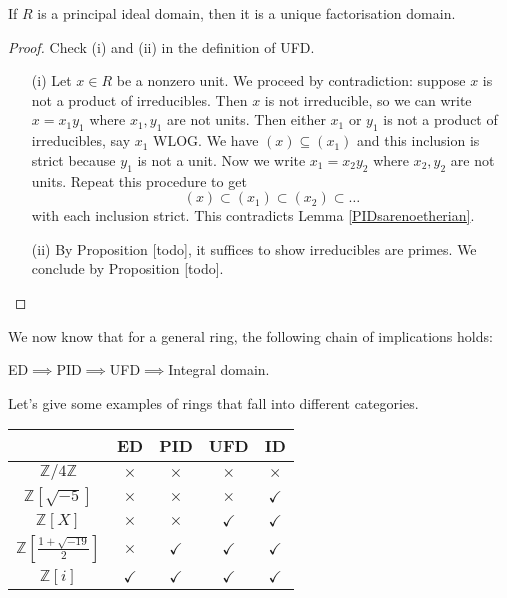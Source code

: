 \documentclass[egregdoesnotlikesansseriftitles,a4paper]{scrartcl}
\begin{document}
\begin{theorem}
       If $R$ is a principal ideal domain, then it is a unique factorisation domain.
       \begin{proof}
            Check (i) and (ii) in the definition of UFD.
            \begin{itemize}
                  \item[(i)] Let $ x \in R$ be a nonzero unit. We proceed by contradiction: suppose $x$ is not a product of irreducibles. Then $x $ is not irreducible, so we can write $x= x_1 y_1 $ where $x_1 ,y_1 $ are not units. Then either $x_1 $ or $y_1$ is not a product of irreducibles, say $x_1 $ WLOG. We have $(x)\subseteq (x_1 )$ and this inclusion is strict because $y_1 $ is not a unit.
                  Now we write $x_1 =x_2 y_2 $ where $x_2 , y_2 $ are not units. Repeat this procedure to get \[
                  (x)\subset (x_1 )\subset (x_2 ) \subset \ldots 
                  \] with each inclusion strict. This contradicts Lemma \ref{PIDsarenoetherian}.
                  \item[(ii)] By Proposition [todo], it suffices to show irreducibles are primes. We conclude by Proposition [todo].
            \end{itemize}
     \end{proof}
\end{theorem}
\begin{remark}
       We now know that for a general ring, the following chain of implications holds:
       \begin{center}
            ED$\implies $PID$\implies $UFD$\implies $Integral domain.
       \end{center}
       Let's give some examples of rings that fall into different categories.
       \begin{center}
            \begin{tabular}{c|cccc}
                  &ED&PID&UFD&ID\\
                  \hline
                  $\mathbb{Z}/4\mathbb{Z}$\footnotemark[1]&$\times$&$\times$&$\times$&$\times$\\
                  $\mathbb{Z}[\sqrt{-5}]$\footnotemark[2]&$\times$&$\times$&$\times$&$\checkmark$\\
                  $\mathbb{Z}[X]$\footnotemark[3]&$\times$&$\times$&$\checkmark$&$\checkmark$\\
                  $\mathbb{Z}[ \frac{1+\sqrt{-19} }{2}]$\footnotemark[4]&$\times$&$\checkmark$&$\checkmark$&$\checkmark$\\
                  $\mathbb{Z}[ i]$\footnotemark[5]&$\checkmark$&$\checkmark$&$\checkmark$&$\checkmark$\\
            \end{tabular}
       \end{center} 
\end{remark}
\end{document}
